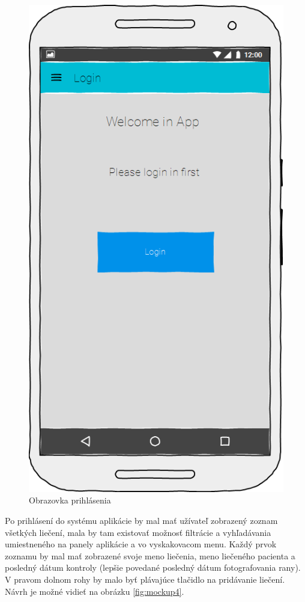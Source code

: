 \begin{figure}[h]
      \centering
      \includegraphics[scale=0.45]{fig/mockup1.png}
      \caption{Obrazovka prihlásenia}
      \label{fig:mockup1}
\end{figure}

Po prihlásení do systému aplikácie by mal mať užívateľ zobrazený zoznam všetkých liečení, mala by tam existovať možnosť filtrácie a vyhľadávania umiestneného na panely aplikácie a vo vyskakovacom menu. Každý prvok zoznamu by mal mať zobrazené svoje meno liečenia, meno liečeného pacienta a posledný dátum kontroly (lepšie povedané posledný dátum fotografovania rany). V pravom dolnom rohy by malo byť plávajúce tlačidlo na pridávanie liečení. Návrh je možné vidieť na obrázku \ref{fig:mockup4}. 

